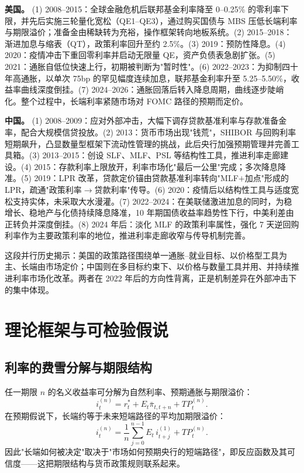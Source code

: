\documentclass[12pt,a4paper]{ctexart}
\begin{document}
\textbf{美国。} (1) 2008--2015：全球金融危机后联邦基金利率降至 0--0.25\% 的零利率下限，并先后实施三轮量化宽松（QE1--QE3），通过购买国债与 MBS 压低长端利率与期限溢价；准备金由稀缺转为充裕，操作框架转向地板系统。(2) 2015--2018：渐进加息与缩表（QT），政策利率回升至约 2.5\%。(3) 2019：预防性降息。(4) 2020：疫情冲击下重回零利率并启动无限量 QE，资产负债表急剧扩张。(5) 2021：通胀自低位快速上行，初期被判断为"暂时性"。(6) 2022--2023：为抑制四十年高通胀，以单次 75bp 的罕见幅度连续加息，联邦基金利率升至 5.25--5.50\%，收益率曲线深度倒挂。(7) 2024--2026：通胀回落后转入降息周期，曲线逐步陡峭化。整个过程中，长端利率紧随市场对 FOMC 路径的预期而定价。

\textbf{中国。} (1) 2008--2009：应对外部冲击，大幅下调存贷款基准利率与存款准备金率，配合大规模信贷投放。(2) 2013：货币市场出现"钱荒"，SHIBOR 与回购利率短期飙升，凸显数量型框架下流动性管理的挑战，此后央行加强预期管理并完善工具箱。(3) 2013--2015：创设 SLF、MLF、PSL 等结构性工具，推进利率走廊建设。(4) 2015：存款利率上限放开，利率市场化"最后一公里"完成；多次降息降准。(5) 2019：LPR 改革，贷款定价锚由贷款基准利率转向"MLF$+$加点"形成的 LPR，疏通"政策利率$\to$贷款利率"传导。(6) 2020：疫情后以结构性工具与适度宽松支持实体，未采取大水漫灌。(7) 2022--2024：在美联储激进加息的同时，为稳增长、稳地产与化债持续降息降准，10 年期国债收益率趋势性下行，中美利差由正转负并深度倒挂。(8) 2024 年后：淡化 MLF 的政策利率属性，强化 7 天逆回购利率作为主要政策利率的地位，推进利率走廊收窄与传导机制完善。

这段并行历史揭示：美国的政策路径围绕单一通胀--就业目标、以价格型工具为主、长端由市场定价；中国则在多目标约束下、以价格与数量工具并用、并持续推进利率市场化改革。两者在 2022 年后的方向性背离，正是机制差异在外部冲击下的集中体现。

\section{理论框架与可检验假说}

\subsection{利率的费雪分解与期限结构}
任一期限 $n$ 的名义收益率可分解为自然利率、预期通胀与期限溢价：
\begin{equation}
i_t^{(n)} = r_t^{*} + E_t\bar\pi_{t,t+n} + TP_t^{(n)}.
\end{equation}
在预期假说下，长端约等于未来短端路径的平均加期限溢价：
\begin{equation}
i_t^{(n)} = \frac{1}{n}\sum_{j=0}^{n-1} E_t\, i_{t+j}^{(1)} + TP_t^{(n)}.
\end{equation}
因此"长端如何被决定"取决于"市场如何预期央行的短端路径"，即反应函数及其可信度——这把期限结构与货币政策规则联系起来。
\end{document}
